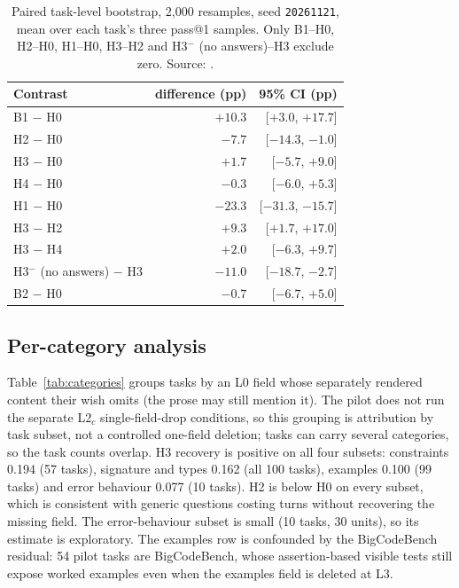 \documentclass{article}
\begin{document}
\begin{table}[!ht]
  \centering
  \small
  \begin{tabular}{@{}lrr@{}}
    \toprule
    Contrast & difference (pp) & 95\% CI (pp) \\
    \midrule
    B1 $-$ H0 & $+10.3$ & [$+3.0$, $+17.7$] \\
    H2 $-$ H0 & $-7.7$ & [$-14.3$, $-1.0$] \\
    H3 $-$ H0 & $+1.7$ & [$-5.7$, $+9.0$] \\
    H4 $-$ H0 & $-0.3$ & [$-6.0$, $+5.3$] \\
    H1 $-$ H0 & $-23.3$ & [$-31.3$, $-15.7$] \\
    H3 $-$ H2 & $+9.3$ & [$+1.7$, $+17.0$] \\
    H3 $-$ H4 & $+2.0$ & [$-6.3$, $+9.7$] \\
    H3$^-$ (no answers) $-$ H3 & $-11.0$ & [$-18.7$, $-2.7$] \\
    B2 $-$ H0 & $-0.7$ & [$-6.7$, $+5.0$] \\
    \bottomrule
  \end{tabular}
  \caption{Paired task-level bootstrap, 2{,}000 resamples, seed \texttt{20261121}, mean over
  each task's three pass@1 samples. Only B1--H0, H2--H0, H1--H0, H3--H2 and
  H3$^-$ (no answers)--H3 exclude zero. Source: \protect{}.}
  \label{tab:bootstrap}
\end{table}

\subsection{Per-category analysis}

Table~\ref{tab:categories} groups tasks by an L0 field whose separately rendered content
their wish omits (the prose may still mention it). The pilot does not run the separate L2$_c$
single-field-drop conditions, so this grouping is attribution by task subset, not a controlled
one-field deletion; tasks can carry several categories, so the task counts overlap. H3 recovery is positive on all four subsets: constraints 0.194 (57 tasks),
signature and types 0.162 (all 100 tasks), examples 0.100 (99 tasks) and error behaviour 0.077
(10 tasks). H2 is below H0 on every subset, which is consistent with generic questions costing
turns without recovering the missing field. The error-behaviour subset is small (10 tasks,
30 units), so its estimate is exploratory. The examples row is confounded by the BigCodeBench
residual: 54 pilot tasks are BigCodeBench, whose assertion-based visible tests still expose
worked examples even when the examples field is deleted at L3.
\end{document}
